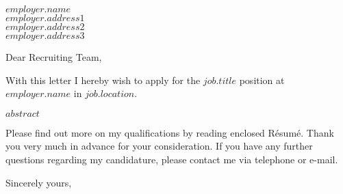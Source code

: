 \documentclass{letter}
\begin{document}
 
\begin{letter}{$employer.name$ \\ $employer.address1$ \\ $employer.address2$ \\ $employer.address3$} 
\opening{Dear Recruiting Team,} 
With this letter I hereby wish to apply for the \textbf{$job.title$} position at $employer.name$ in $job.location$.

$abstract$


Please find out more on my qualifications by reading enclosed Résumé. Thank you very much in advance for your consideration. If you have any further questions regarding my candidature, please contact me via telephone or e-mail.


\closing{Sincerely yours,\\
 \\
}
 
\end{letter} 
\end{document}
